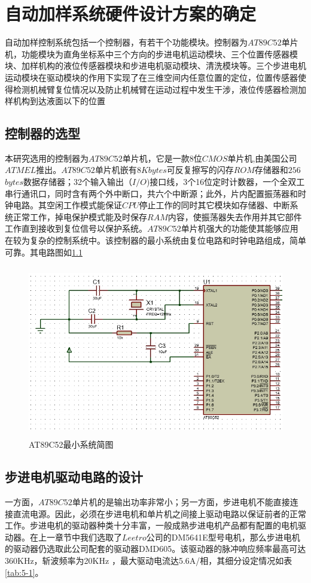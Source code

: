 \chapter{自动加样系统硬件设计方案的确定}
自动加样控制系统包括一个控制器，有若干个功能模块。控制器为$AT89C52$单片机，功能模块为直角坐标系中三个方向的步进电机运动模块、三个位置传感器模块、加样机构的液位传感器模块和步进电机驱动模块、清洗模块等。三个步进电机运动模块在驱动模块的作用下实现了在三维空间内任意位置的定位，位置传感器使得检测机械臂复位情况以及防止机械臂在运动过程中发生干涉，液位传感器检测加样机构到达液面以下的位置
\section{控制器的选型}
本研究选用的控制器为$AT89C52$单片机，它是一款8位$CMOS$单片机,由美国公司$ATMEL$推出。$AT89C52$单片机嵌有$8K bytes$可反复擦写的闪存$ROM$存储器和$256$ $bytes$数据存储器；32个输入输出（$I/O$)接口线，3个16位定时计数器，一个全双工串行通讯口，同时含有两个外中断口，共六个中断源；此外，片内配置振荡器和时钟电路。其空闲工作模式能保证$CPU$停止工作的同时其它模块如存储器、中断系统正常工作，掉电保护模式能及时保存$RAM$内容，使振荡器失去作用并其它部件工作直到接收到复位信号以保护系统\supercite{bib14}。$AT89C52$单片机强大的功能使其能够应用在较为复杂的控制系统中。该控制器的最小系统由复位电路和时钟电路组成，简单可靠。其电路图如\ref{fig:5-1}

\begin{figure}[htbp!]
	\centering
	\includegraphics[height=7.5cm]{chap/figure/5-1.jpg}
	\caption{AT89C52最小系统简图}
	\label{fig:5-1}
\end{figure}

\section{步进电机驱动电路的设计}
一方面，$AT89C52$单片机的是输出功率非常小；另一方面，步进电机不能直接连接直流电源。因此，必须在步进电机和单片机之间接上驱动电路以保证前者的正常工作。步进电机的驱动器种类十分丰富，一般成熟步进电机产品都有配置的电机驱动器。在上一章节中我们选取了$Leetro$公司的DM5641E型号电机，那么步进电机的驱动器仍选取此公司配套的驱动器DMD605。该驱动器的脉冲响应频率最高可达360KHz，斩波频率为20KHz ，最大驱动电流达5.6A/相，其细分设定情况如表\ref{tab:5-1}。


